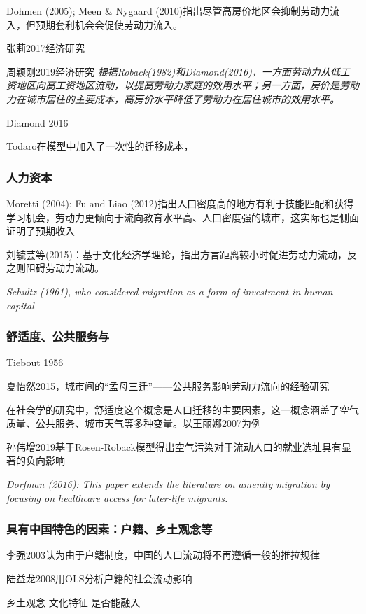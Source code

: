 \documentclass[10pt,a4paper]{article}
\begin{document}
Dohmen (2005); Meen \& Nygaard (2010)指出尽管高房价地区会抑制劳动力流入，但预期套利机会会促使劳动力流入。

张莉2017经济研究

周颖刚2019经济研究
\textit{根据Roback(1982)和Diamond(2016)，一方面劳动力从低工资地区向高工资地区流动，以提高劳动力家庭的效用水平；另一方面，房价是劳动力在城市居住的主要成本，高房价水平降低了劳动力在居住城市的效用水平。}

Diamond 2016

Todaro在模型中加入了一次性的迁移成本，



\subsubsection{人力资本}
Moretti (2004); Fu and Liao (2012)指出人口密度高的地方有利于技能匹配和获得学习机会，劳动力更倾向于流向教育水平高、人口密度强的城市，这实际也是侧面证明了预期收入

刘毓芸等(2015)：基于文化经济学理论，指出方言距离较小时促进劳动力流动，反之则阻碍劳动力流动。

\textit{Schultz (1961), who considered migration as a form of investment in human capital}

\subsubsection{舒适度、公共服务与}
Tiebout 1956

夏怡然2015，城市间的“孟母三迁”——公共服务影响劳动力流向的经验研究

在社会学的研究中，舒适度这个概念是人口迁移的主要因素，这一概念涵盖了空气质量、公共服务、城市天气等多种变量。以王丽娜2007为例

孙伟增2019基于Rosen-Roback模型得出空气污染对于流动人口的就业选址具有显著的负向影响


\textit{Dorfman (2016): This paper extends the literature on amenity migration by focusing on healthcare access for later‐life migrants.}

\subsubsection{具有中国特色的因素：户籍、乡土观念等}

李强2003认为由于户籍制度，中国的人口流动将不再遵循一般的推拉规律

陆益龙2008用OLS分析户籍的社会流动影响

乡土观念
文化特征
是否能融入
\end{document}
